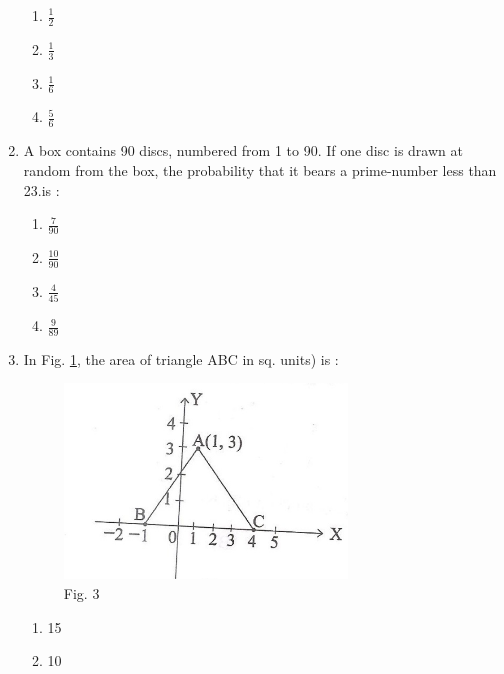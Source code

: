 \documentclass[journal,12pt,twocolumn]{IEEEtran}
\renewcommand\thesection{\arabic{section}}
\begin{document}
\begin{enumerate}[label=\thesection.\arabic*.,ref=\thesection.\theenumi]
 \begin{enumerate}
    \item $\frac{1}{2}$\\
    \item $\frac{1}{3}$\\
    \item $\frac{1}{6}$\\
    \item $\frac{5}{6}$
 \end{enumerate}
 \item A box contains 90 discs, numbered from 1 to 90. If one disc is drawn at random from the box, the probability that it bears a prime-number less than 23.is :
 
 \begin{enumerate}
    \item $\frac{7}{90}$\\
    \item $\frac{10}{90}$\\
    \item $\frac{4}{45}$\\
    \item $\frac{9}{89}$
 \end{enumerate}
\item In Fig. \ref{fig3}, the area of triangle ABC in sq. units) is :
	\begin{figure}
		\centering
\includegraphics[width=\columnwidth]{3.png}
\caption{Fig. 3}
\label{fig3}
	\end{figure}
 \begin{enumerate}
    \item 15\\
    \item 10\\

\end{enumerate}
\end{enumerate}
\end{document}
